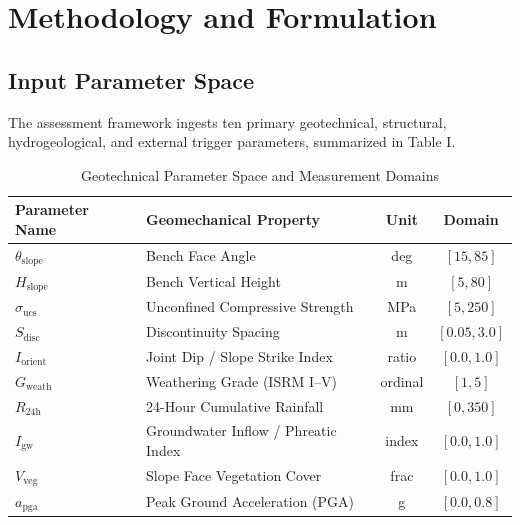 \documentclass[conference]{IEEEtran}
\begin{document}
\section{Methodology and Formulation}

\subsection{Input Parameter Space}
The assessment framework ingests ten primary geotechnical, structural, hydrogeological, and external trigger parameters, summarized in Table I.

\begin{table}[htbp]
\caption{Geotechnical Parameter Space and Measurement Domains}
\begin{center}
\begin{tabular}{llcc}
\toprule
\textbf{Parameter Name} & \textbf{Geomechanical Property} & \textbf{Unit} & \textbf{Domain} \\
\midrule
$\theta_{\text{slope}}$ & Bench Face Angle & deg & $[15, 85]$ \\
$H_{\text{slope}}$ & Bench Vertical Height & m & $[5, 80]$ \\
$\sigma_{\text{ucs}}$ & Unconfined Compressive Strength & MPa & $[5, 250]$ \\
$S_{\text{disc}}$ & Discontinuity Spacing & m & $[0.05, 3.0]$ \\
$I_{\text{orient}}$ & Joint Dip / Slope Strike Index & ratio & $[0.0, 1.0]$ \\
$G_{\text{weath}}$ & Weathering Grade (ISRM I--V) & ordinal & $[1, 5]$ \\
$R_{24\text{h}}$ & 24-Hour Cumulative Rainfall & mm & $[0, 350]$ \\
$I_{\text{gw}}$ & Groundwater Inflow / Phreatic Index & index & $[0.0, 1.0]$ \\
$V_{\text{veg}}$ & Slope Face Vegetation Cover & frac & $[0.0, 1.0]$ \\
$a_{\text{pga}}$ & Peak Ground Acceleration (PGA) & g & $[0.0, 0.8]$ \\
\bottomrule
\end{tabular}
\label{tab:params}
\end{center}
\end{table}
\end{document}
